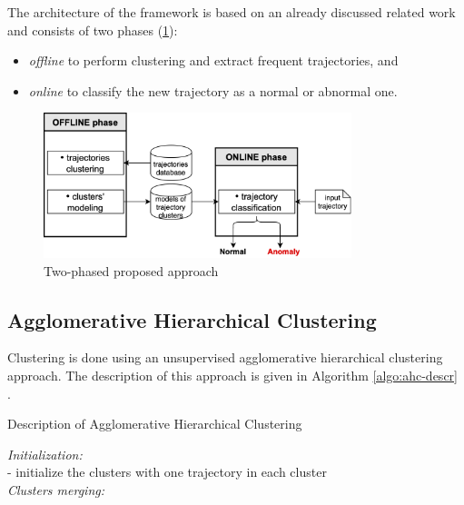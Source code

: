 The architecture of the framework is based on an already discussed related work \cite{inproceedings:7_related_work} and consists of two phases (\ref{fig:str}):
\begin{itemize}
	\item \textit{offline} to perform clustering and extract frequent trajectories, and
	\item \textit{online} to classify the new trajectory as a normal or abnormal one.
\end{itemize}
\begin{figure}[!htb]
	\centering{}
	\includegraphics[width=0.8\textwidth]{images/str.png}
	\caption{Two-phased proposed approach}
	\label{fig:str}
\end{figure}


\subsection{Agglomerative Hierarchical Clustering}

Clustering is done using an unsupervised agglomerative hierarchical clustering approach. The description of this approach is given in Algorithm \ref{algo:ahc-descr} \cite{inproceedings:7_related_work}.

\begin{algorithm}
	\caption{Description of Agglomerative Hierarchical Clustering}
	\label{algo:ahc-descr}
	\SetAlgoLined
	\textit{Initialization:} \\
	- initialize the clusters with one trajectory in each cluster \\
	\textit{Clusters merging:}\\
	
\end{algorithm}

